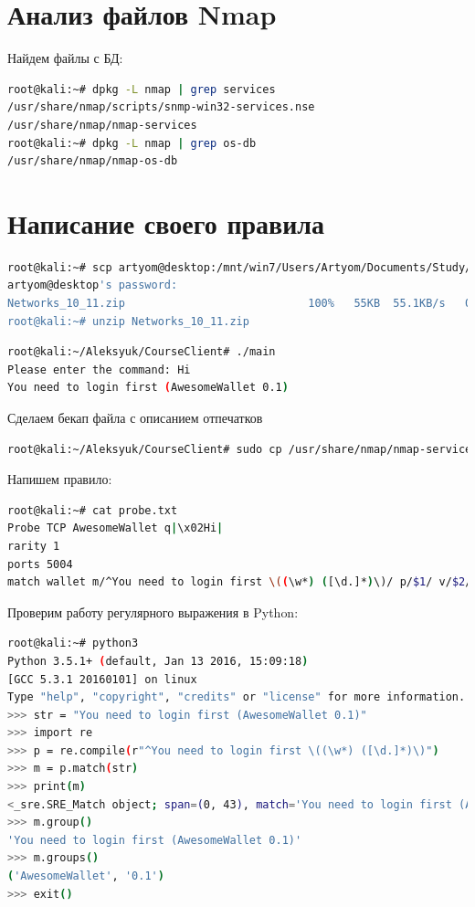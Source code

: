 \section{Анализ файлов Nmap}

Найдем файлы с БД:

\begin{lstlisting}[language=bash]
root@kali:~# dpkg -L nmap | grep services
/usr/share/nmap/scripts/snmp-win32-services.nse
/usr/share/nmap/nmap-services
root@kali:~# dpkg -L nmap | grep os-db
/usr/share/nmap/nmap-os-db
\end{lstlisting}

\section{Написание своего правила}

\begin{lstlisting}[language=bash]
root@kali:~# scp artyom@desktop:/mnt/win7/Users/Artyom/Documents/Study/Networks_new/Networks_10_11.zip .
artyom@desktop's password: 
Networks_10_11.zip                            100%   55KB  55.1KB/s   00:01    
root@kali:~# unzip Networks_10_11.zip 
\end{lstlisting}

\begin{lstlisting}[language=bash]
root@kali:~/Aleksyuk/CourseClient# ./main 
Please enter the command: Hi
You need to login first (AwesomeWallet 0.1)
\end{lstlisting}

Сделаем бекап файла с описанием отпечатков

\begin{lstlisting}[language=bash]
root@kali:~/Aleksyuk/CourseClient# sudo cp /usr/share/nmap/nmap-service-probes /usr/share/nmap/nmap-service-probes.backup
\end{lstlisting}

Напишем правило:

\begin{lstlisting}[language=bash]
root@kali:~# cat probe.txt 
Probe TCP AwesomeWallet q|\x02Hi|
rarity 1
ports 5004
match wallet m/^You need to login first \((\w*) ([\d.]*)\)/ p/$1/ v/$2/
\end{lstlisting}

Проверим работу регулярного выражения в Python:

\begin{lstlisting}[language=bash]
root@kali:~# python3
Python 3.5.1+ (default, Jan 13 2016, 15:09:18) 
[GCC 5.3.1 20160101] on linux
Type "help", "copyright", "credits" or "license" for more information.
>>> str = "You need to login first (AwesomeWallet 0.1)"
>>> import re
>>> p = re.compile(r"^You need to login first \((\w*) ([\d.]*)\)")
>>> m = p.match(str)
>>> print(m)
<_sre.SRE_Match object; span=(0, 43), match='You need to login first (AwesomeWallet 0.1)'>
>>> m.group()
'You need to login first (AwesomeWallet 0.1)'
>>> m.groups()
('AwesomeWallet', '0.1')
>>> exit()
\end{lstlisting}

